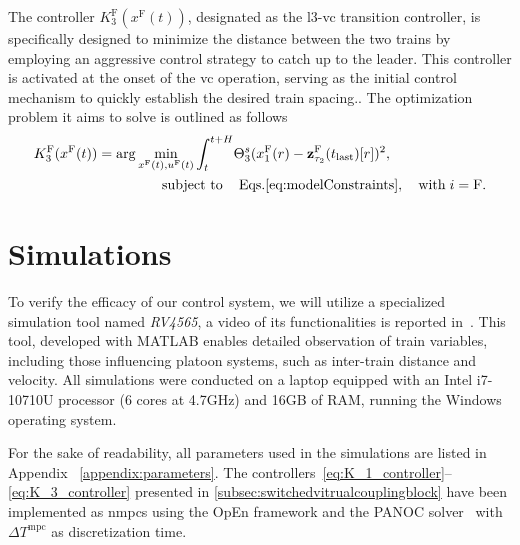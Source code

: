 \documentclass[letterpaper, 10 pt, conference]{ieeeconf}
\theoremstyle{definition}
\theoremstyle{nopoint}
\newcommand{\tildeAdd}{~}
\begin{document}
The controller $K^{\mathrm{F}}_3(x^{\mathrm{F}}(t))$, designated as the \gls{l3}-\gls{vc} transition controller, is specifically designed to minimize the distance between the two trains by employing an aggressive control strategy to catch up to the leader. This controller is activated at the onset of the \gls{vc} operation, serving as the initial control mechanism to quickly establish the desired train spacing.. The optimization problem it aims to solve is outlined as follows
%
\begin{equation}
	\label{eq:K_3_controller}
	\begin{aligned}
		K^{\mathrm{F}}_3(x^\mathrm{F}(t)) = \arg  \min_{x^{\mathrm{F}}(t), u^{\mathrm{F}}(t)} \int_{t}^{t+H}& \Theta^s_3(x_1^{\mathrm{F}}(r)-\mathbf{z}_{\tau_2}^\mathrm{F}(t_{\mathrm{last}})[r])^2, \\
		&	\hspace{-1.8cm} \text{subject to} \qquad \hspace{-1cm}  \qquad \mathrm{Eqs.}\eqref{eq:modelConstraints}, \quad \mathrm{with} \; i = \mathrm{F}.
	\end{aligned}
\end{equation}






 
\section{Simulations}
 \label{sec:Simulations}
 
  To verify the efficacy of our control system, we will utilize a specialized simulation tool named \textit{RV4565}, a video of its functionalities is reported in\tildeAdd\cite{youtubeVideo}. This tool, developed with MATLAB enables detailed observation of train variables, including those influencing platoon systems, such as inter-train distance and velocity. All simulations were conducted on a laptop equipped with an Intel i7-10710U processor (6 cores at 4.7GHz) and 16GB of RAM, running the Windows operating system.
  
  
  For the sake of readability, all parameters used in the simulations are listed in Appendix \tildeAdd\ref{appendix:parameters}.   The controllers\tildeAdd\eqref{eq:K_1_controller}–\eqref{eq:K_3_controller} presented in \ref{subsec:switchedvitrualcouplingblock} have been implemented as \glspl{nmpc} using the OpEn framework and the PANOC solver\tildeAdd\cite{open2020} with $\Delta T^{\mathrm{mpc}}$ as discretization time. 
  
\end{document}

